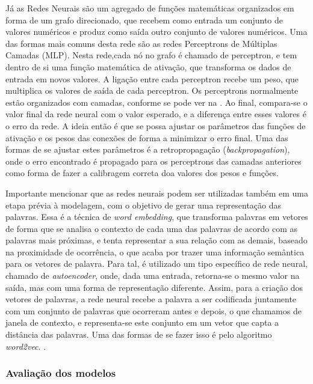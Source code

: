 Já as Redes Neurais \cite{redesNeurais} são um agregado de funções matemáticas organizados em forma de um grafo direcionado, que recebem como entrada um conjunto de valores numéricos e produz como saída outro conjunto de valores numéricos. Uma das formas mais comuns desta rede são as redes Perceptrons de Múltiplas Camadas (MLP). Nesta rede,cada nó no grafo é chamado de perceptron, e tem dentro de si uma função matemática de ativação, que transforma os dados de entrada em novos valores. A ligação entre cada perceptron recebe um peso, que multiplica os valores de saída de cada perceptron. Os perceptrons normalmente estão organizados com camadas, conforme se pode ver na . Ao final, compara-se o valor final da rede neural com o valor esperado, e a diferença entre esses valores é o erro da rede. A ideia então é que se possa ajustar os parâmetros das funções de ativação e os pesos das conexões de forma a minimizar o erro final. Uma das formas de se ajustar estes parâmetros é a retropropagação (\textit{backpropagation}), onde o erro encontrado é propagado para os perceptrons das camadas anteriores como forma de fazer a calibragem correta doa valores dos pesos e funções.

%

Importante mencionar que as redes neurais podem ser utilizadas também em uma etapa prévia à modelagem, com o objetivo de gerar uma representação das palavras. Essa é a técnica de\textit{ word embedding}, que transforma palavras em vetores de forma que se analisa o contexto de cada uma das palavras de acordo com as palavras mais próximas, e tenta representar a sua relação com as demais, baseado na proximidade de ocorrência, o que acaba por trazer uma informação semântica para os vetores de palavra. Para tal, é utilizado um tipo específico de rede neural, chamado de \textit{autoencoder}, onde, dada uma entrada, retorna-se o mesmo valor na saída, mas com uma forma de representação diferente. Assim, para a criação dos vetores de palavras, a rede neural recebe a palavra a ser codificada juntamente com um conjunto de palavras que ocorreram antes e depois, o que chamamos de janela de contexto, e representa-se este conjunto em um vetor que capta a distância das palavras. Uma das formas de se fazer isso é pelo algoritmo \textit{word2vec}. \cite{word2vec}.

\subsubsection{Avaliação dos modelos}


